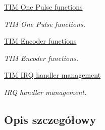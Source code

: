 \begin{DoxyCompactItemize}
\hyperlink{group___t_i_m___exported___functions___group5}{T\+I\+M One Pulse functions}
\begin{DoxyCompactList}\small\item\em T\+IM One Pulse functions. \end{DoxyCompactList}\item 
\hyperlink{group___t_i_m___exported___functions___group6}{T\+I\+M Encoder functions}
\begin{DoxyCompactList}\small\item\em T\+IM Encoder functions. \end{DoxyCompactList}\item 
\hyperlink{group___t_i_m___exported___functions___group7}{T\+I\+M I\+R\+Q handler management}
\begin{DoxyCompactList}\small\item\em I\+RQ handler management. \end{DoxyCompactList}\end{DoxyCompactItemize}


\subsection{Opis szczegółowy}
